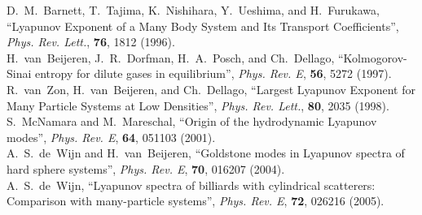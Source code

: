 \documentclass[a4paper, onecolumn]{revtex4-1}
\begin{document}
\begin{thebibliography}{1}
D.~M.~Barnett, T.~Tajima, K.~Nishihara, Y.~Ueshima, and H.~Furukawa, 
``Lyapunov Exponent of a Many Body System and Its Transport Coefficients'', 
{\em Phys. Rev. Lett.},  {\bf 76}, 1812 (1996). 
%
\\
%
H.~van~Beijeren, J.~R.~Dorfman, H.~A.~Posch, and Ch.~Dellago, 
``Kolmogorov-Sinai entropy for dilute gases in equilibrium'', 
{\em Phys. Rev. E}, {\bf 56}, 5272 (1997). 
%
\\
%
R.~van~Zon, H.~van~Beijeren, and Ch.~Dellago, 
``Largest Lyapunov Exponent for Many Particle Systems at Low Densities'', 
{\em Phys. Rev. Lett.},  {\bf 80}, 2035 (1998). 
%
\\
%
S.~McNamara and M.~Mareschal, 
``Origin of the hydrodynamic Lyapunov modes'', 
{\em Phys. Rev. E},  {\bf 64}, 051103 (2001). 
%
\\
%
A.~S.~de~Wijn and H.~van~Beijeren, 
``Goldstone modes in Lyapunov spectra of hard sphere systems'', 
{\em Phys. Rev. E},  {\bf 70}, 016207 (2004).
%
\\
%
A.~S.~de~Wijn, 
``Lyapunov spectra of billiards with cylindrical scatterers: Comparison with many-particle
systems'', 
{\em Phys. Rev. E},  {\bf 72}, 026216 (2005). 




\end{thebibliography}
\end{document}
